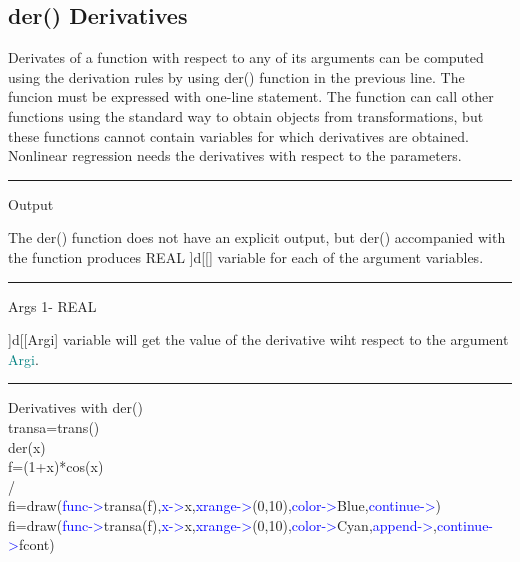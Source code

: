 \subsection{\textcolor{VioletRed}{der}() Derivatives}
\label{der}
Derivates of a function with respect to any of its arguments can be
computed using the derivation rules by using \textcolor{VioletRed}{der}() function in the previous line. The funcion must be expressed with
one-line statement. The function can call other functions using the standard way
to obtain objects from transformations, but these functions cannot
contain variables for which derivatives are obtained.
Nonlinear regression needs the derivatives with respect to the parameters.
\vspace{0.3cm}
\hrule
\vspace{0.3cm}
\noindent Output  \tabto{3cm}    \tabto{5cm}     \tabto{7cm}
\begin{changemargin}{3cm}{0cm}
\noindent  The \textcolor{VioletRed}{der}() function does not have an explicit output, but
\textcolor{VioletRed}{der}() accompanied with the function produces REAL ]d[[] variable for each of the
argument variables.
\end{changemargin}
\vspace{0.3cm}
\hrule
\vspace{0.3cm}
\noindent Args  \tabto{3cm} 1-  \tabto{5cm}   REAL  \tabto{7cm}
\begin{changemargin}{3cm}{0cm}
\noindent   ]d[[Argi] variable will get the value of the derivative wiht
respect to the argument \textcolor{teal}{Argi}.
\end {changemargin}
\hrule
\vspace{0.2cm}
\begin{example}[derex]Derivatives with \textcolor{VioletRed}{der}()\\
\label{derex}
transa=\textcolor{VioletRed}{trans}()\\
\textcolor{VioletRed}{der}(x)\\
f=(1+x)*cos(x)\\
/\\
fi=\textcolor{VioletRed}{draw}(\textcolor{blue}{func->}transa(f\x),\textcolor{blue}{x->}x,\textcolor{blue}{xrange->}(0,10),\textcolor{blue}{color->}Blue,\textcolor{blue}{continue->})\\
fi=\textcolor{VioletRed}{draw}(\textcolor{blue}{func->}transa(f),\textcolor{blue}{x->}x,\textcolor{blue}{xrange->}(0,10),\textcolor{blue}{color->}Cyan,\textcolor{blue}{append->},\textcolor{blue}{continue->}fcont)
\end{example}
